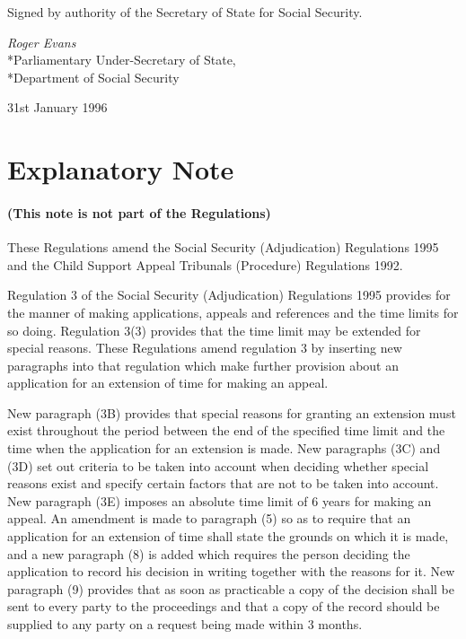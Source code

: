 \documentclass[a4paper]{article}
\newcommand{\parthead}{}
\begin{document}
\bigskip

Signed by authority of the Secretary of State for Social Security.

{\raggedleft
\emph{Roger Evans}\\*Parliamentary Under-Secretary of State,\\*Department of Social Security

}

31st January 1996

\part{Explanatory Note}

\renewcommand\parthead{--- Explanatory Note}

\subsection*{(This note is not part of the Regulations)}

These Regulations amend the Social Security (Adjudication) Regulations 1995 and the Child Support Appeal Tribunals (Procedure) Regulations 1992.

  Regulation 3 of the Social Security (Adjudication) Regulations 1995 provides for the manner of making applications, appeals and references and the time limits for so doing. Regulation 3(3) provides that the time limit may be extended for special reasons. These Regulations amend regulation 3 by inserting new paragraphs into that regulation which make further provision about an application for an extension of time for making an appeal.

  New paragraph (3B) provides that special reasons for granting an extension must exist throughout the period between the end of the specified time limit and the time when the application for an extension is made. New paragraphs (3C) and (3D) set out criteria to be taken into account when deciding whether special reasons exist and specify certain factors that are not to be taken into account. New paragraph (3E) imposes an absolute time limit of 6 years for making an appeal. An amendment is made to paragraph (5) so as to require that an application for an extension of time shall state the grounds on which it is made, and a new paragraph (8) is added which requires the person deciding the application to record his decision in writing together with the reasons for it. New paragraph (9) provides that as soon as practicable a copy of the decision shall be sent to every party to the proceedings and that a copy of the record should be supplied to any party on a request being made within 3 months.
\end{document}

